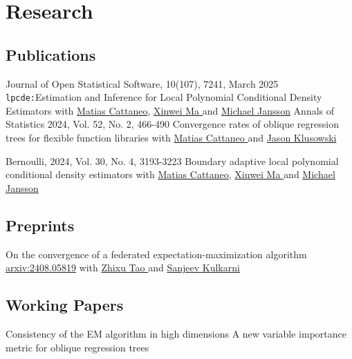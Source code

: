 \documentclass[10pt,a4paper,roman]{moderncv}        %
\begin{document}
\vspace{-0.3cm}
\section{Research}
\subsection{Publications}
\cventry{}
{Journal of Open Statistical Software, 10(107), 7241, March 2025}
{\texttt{lpcde:}Estimation and Inference for Local Polynomial Conditional Density Estimators}
{}
{}
{with \color{blue}\href{https://cattaneo.princeton.edu}{Matias Cattaneo}\color{black},
  \color{blue}\href{https://sites.google.com/view/xinweima/home?authuser=0}{Xinwei
    Ma }\color{black}
  and
  \color{blue}\href{https://sites.google.com/berkeley.edu/michael-jansson/}{Michael
    Jansson}\color{black}
}
\cventry{}
{Annals of Statistics 2024, Vol. 52, No. 2, 466-490}
{Convergence rates of oblique regression trees for flexible function libraries}
{}
{}
{with
  \color{blue}\href{https://cattaneo.princeton.edu}{Matias Cattaneo }\color{black} and
  \color{blue}\href{https://klusowski.princeton.edu}{Jason Klusowski}}

\cventry{}
{Bernoulli, 2024, Vol. 30, No. 4, 3193-3223}
{Boundary adaptive local polynomial conditional density estimators}
{}
{}
{with \color{blue}\href{https://cattaneo.princeton.edu}{Matias Cattaneo}\color{black},
  \color{blue}\href{https://sites.google.com/view/xinweima/home?authuser=0}{Xinwei
    Ma }\color{black}
  and
  \color{blue}\href{https://sites.google.com/berkeley.edu/michael-jansson/}{Michael
    Jansson}\color{black}
}

\subsection{Preprints}
{\vspace{-0.4cm}}
{On the convergence of a federated expectation-maximization algorithm}
{\color{blue}\href{https://arxiv.org/abs/2408.05819}{arxiv:2408.05819}\color{black}}
{}
{with
  \color{blue}\href{https://www.linkedin.com/in/zhixu-tao-a02b77199/}{Zhixu Tao }\color{black} and
  \color{blue}\href{https://www.princeton.edu/~kulkarni/}{Sanjeev Kulkarni}
}
\subsection{Working Papers}
{Consistency of the EM algorithm in high dimensions} {}{}{}
\cventry{}{\vspace{-0.4cm}}
{A new variable importance metric for oblique regression trees} {}{}{}
\end{document}
